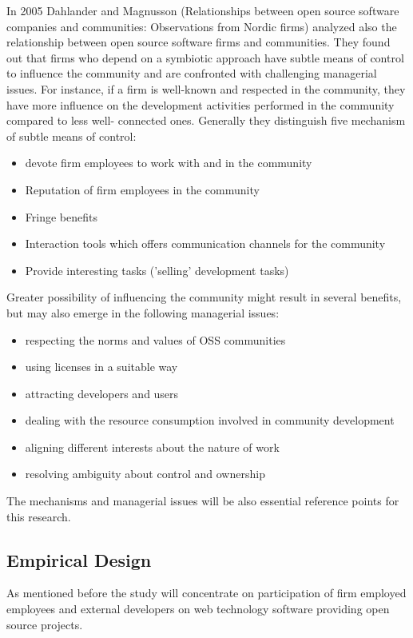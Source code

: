 In 2005 Dahlander and Magnusson (Relationships between open source software companies and communities: Observations from Nordic firms) analyzed also the relationship between open source software firms and communities. They found out that firms who depend on a symbiotic approach have subtle means of control to influence the community and are confronted with challenging managerial issues. For instance, if a firm is well-known and respected in the community, they have more influence on the development activities performed in the community compared to less well- connected ones.
Generally they distinguish five mechanism of subtle means of control:

\begin{itemize}
	\item devote firm employees to work with and in the community
	\item Reputation of firm employees in the community
	\item Fringe benefits
	\item Interaction tools which offers communication channels for the community
	\item Provide interesting tasks ('selling' development tasks)
\end{itemize}

Greater possibility of influencing the community might result in several benefits, but may also emerge in the following managerial issues:

\begin{itemize}
	\item respecting the norms and values of OSS communities
	\item using licenses in a suitable way
	\item attracting developers and users
	\item dealing with the resource consumption involved in community development
	\item aligning different interests about the nature of work
	\item resolving ambiguity about control and ownership
\end{itemize}

The mechanisms and managerial issues will be also essential reference points for this research.

\subsection{Empirical Design}

As mentioned before the study will concentrate on participation of firm employed employees and external developers on web technology software providing open source projects.

